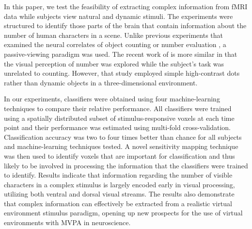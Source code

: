 \documentclass[5p,authoryear]{elsarticle}
\begin{document}
In this paper, we test the feasibility of extracting complex information from fMRI data while subjects view natural and dynamic stimuli.
The experiments were structured to identify those parts of the brain that contain information about the number of human characters in a scene.
Unlike previous experiments that examined the neural correlates of object counting or number evaluation \citep{Dehaene1999,Rickard2000,Barth2006}, a passive-viewing paradigm was used.
The recent work of \cite{Harvey2013} is more similar in that the visual perception of number was explored while the subject's task was unrelated to counting.
However, that study employed simple high-contrast dots rather than dynamic objects in a three-dimensional environment.

In our experiments, classifiers were obtained using four machine-learning techniques to compare their relative performance. 
All classifiers were trained using a spatially distributed subset of stimulus-responsive voxels at each time point and their performance was estimated using multi-fold cross-validation. 
Classification accuracy was two to four times better than chance for all subjects and machine-learning techniques tested.
A novel sensitivity mapping technique was then used to identify voxels that are important for classification and thus likely to be involved in processing the information that the classifiers were trained to identify.
Results indicate that information regarding  the number of visible characters in a complex stimulus is largely encoded early in visual processing, utilizing both ventral and dorsal visual streams.
The results also  demonstrate that complex information can effectively be extracted from a realistic virtual environment stimulus paradigm, opening up new prospects for the use of virtual environments with MVPA in neuroscience.
\end{document}
